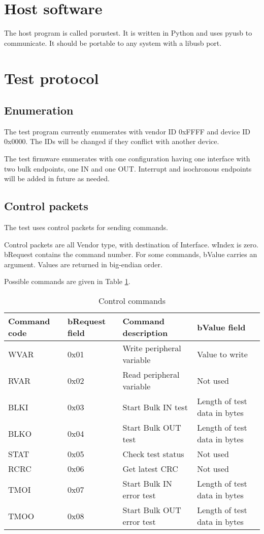 \documentclass[a4paper]{book}
\begin{document}
\section{Host software}

The host program is called porustest. It is written in Python and uses pyusb to communicate.  It should be portable to any system with a libusb port.

\section{Test protocol}
\label{sec:test_protocol}

\subsection{Enumeration}

The test program currently enumerates with vendor ID 0xFFFF and device ID 0x0000.  The IDs will be changed if they conflict with another device.

The test firmware enumerates with one configuration having one interface with two bulk endpoints, one IN and one OUT.  Interrupt and isochronous endpoints will be added in future as needed.

\subsection{Control packets}

The test uses control packets for sending commands.

Control packets are all Vendor type, with destination of Interface.  wIndex is zero.  bRequest contains the command number.  For some commands, bValue carries an argument.  Values are returned in big-endian order.

Possible commands are given in Table \ref{tbl_control_commands}.

\begin{table}
\begin{tabularx}{\textwidth}{|p{1.5cm}|p{1.5cm}|X|X|}
\hline
Command code & bRequest field & Command description & bValue field \\ 
\hline
\hline
WVAR & 0x01 & Write peripheral variable & Value to write \\ 
\hline
RVAR & 0x02 & Read peripheral variable & Not used \\ 
\hline
BLKI & 0x03 & Start Bulk IN test & Length of test data in bytes \\ 
\hline
BLKO & 0x04 & Start Bulk OUT test & Length of test data in bytes \\ 
\hline
STAT & 0x05 & Check test status & Not used \\ 
\hline
RCRC & 0x06 & Get latest CRC & Not used \\ 
\hline
TMOI & 0x07 & Start Bulk IN error test & Length of test data in bytes \\
\hline
TMOO & 0x08 & Start Bulk OUT error test & Length of test data in bytes \\
\hline
\end{tabularx}
\caption{Control commands}
\label{tbl_control_commands}
\end{table}
\end{document}
